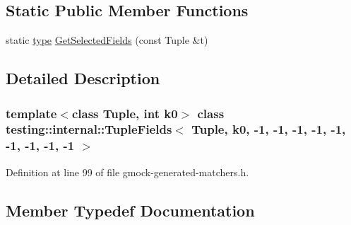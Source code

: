\subsection*{Static Public Member Functions}
\begin{DoxyCompactItemize}
\item 
static \hyperlink{classtesting_1_1internal_1_1TupleFields_3_01Tuple_00_01k0_00_01-1_00_01-1_00_01-1_00_01-1_00_01-d80da5b2d6dff94ddefe7f2fc2de778d_aeb08130cf9faa6f43e0453d2c6d9fd04}{type} \hyperlink{classtesting_1_1internal_1_1TupleFields_3_01Tuple_00_01k0_00_01-1_00_01-1_00_01-1_00_01-1_00_01-d80da5b2d6dff94ddefe7f2fc2de778d_a98b0483efb3db67d08269b30b362a510}{Get\+Selected\+Fields} (const Tuple \&t)
\end{DoxyCompactItemize}


\subsection{Detailed Description}
\subsubsection*{template$<$class Tuple, int k0$>$\newline
class testing\+::internal\+::\+Tuple\+Fields$<$ Tuple, k0, -\/1, -\/1, -\/1, -\/1, -\/1, -\/1, -\/1, -\/1, -\/1 $>$}



Definition at line 99 of file gmock-\/generated-\/matchers.\+h.



\subsection{Member Typedef Documentation}
\mbox{\label{classtesting_1_1internal_1_1TupleFields_3_01Tuple_00_01k0_00_01-1_00_01-1_00_01-1_00_01-1_00_01-d80da5b2d6dff94ddefe7f2fc2de778d_aeb08130cf9faa6f43e0453d2c6d9fd04}} 
